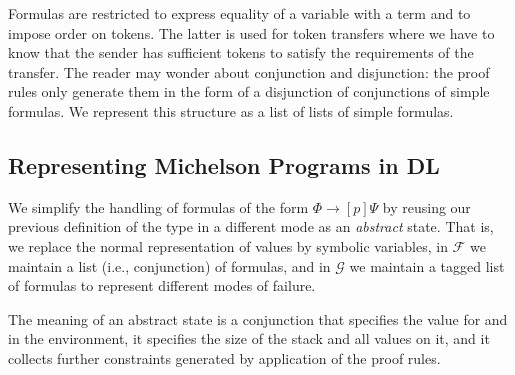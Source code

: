 Formulas are restricted to express equality of a variable with a term
and to impose order on tokens. The latter is used for token transfers
where we have to know that the sender has sufficient tokens to satisfy
the requirements of the transfer. The reader may wonder about 
conjunction and disjunction: the proof rules only generate them in the
form of a disjunction of conjunctions of simple formulas.  We
represent this structure as a list of lists of simple formulas.


\subsection{Representing Michelson Programs in DL}\label{sec:abstract-states}

We simplify the handling of formulas of the form $\Phi \to [p]\Psi$ by
reusing our previous definition of the type  in a
different mode as an \emph{abstract} state.
\AbstractAMode
That is, we replace the normal representation of values by symbolic
variables, in $\mathcal{F}$ we maintain a list (i.e., conjunction) of
formulas, and in $\mathcal{G}$ we maintain a tagged list of formulas
to represent different modes of failure. 

The meaning of an abstract state is a conjunction that specifies the
value for  and  in the environment, it
specifies the size of the stack and all values on it, and it collects
further constraints generated by application of the proof rules.



